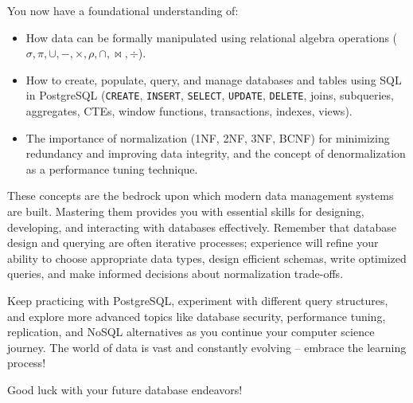\documentclass[12pt]{book}
\begin{document}
You now have a foundational understanding of:
\begin{itemize}
    \item How data can be formally manipulated using relational algebra operations ($\sigma, \pi, \cup, -, \times, \rho, \cap, \Join, \div$).
    \item How to create, populate, query, and manage databases and tables using SQL in PostgreSQL (\texttt{CREATE}, \texttt{INSERT}, \texttt{SELECT}, \texttt{UPDATE}, \texttt{DELETE}, joins, subqueries, aggregates, CTEs, window functions, transactions, indexes, views).
    \item The importance of normalization (1NF, 2NF, 3NF, BCNF) for minimizing redundancy and improving data integrity, and the concept of denormalization as a performance tuning technique.
\end{itemize}

These concepts are the bedrock upon which modern data management systems are built. Mastering them provides you with essential skills for designing, developing, and interacting with databases effectively. Remember that database design and querying are often iterative processes; experience will refine your ability to choose appropriate data types, design efficient schemas, write optimized queries, and make informed decisions about normalization trade-offs.

Keep practicing with PostgreSQL, experiment with different query structures, and explore more advanced topics like database security, performance tuning, replication, and NoSQL alternatives as you continue your computer science journey. The world of data is vast and constantly evolving – embrace the learning process!

Good luck with your future database endeavors!
\end{document}
